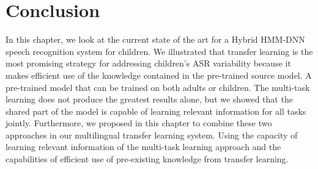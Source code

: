 \section{Conclusion}
In this chapter, we look at the current state of the art for a Hybrid HMM-DNN speech recognition system for children. We illustrated that transfer learning is the most promising strategy for addressing children's ASR variability because it makes efficient use of the knowledge contained in the pre-trained source model. A pre-trained model that can be trained on both adults or children. The multi-task learning does not produce the greatest results alone, but we showed that the shared part of the model is capable of learning relevant information for all tasks jointly. Furthermore, we proposed in this chapter to combine these two approaches in our multilingual transfer learning system. Using the capacity of learning relevant information of the multi-task learning approach and the capabilities of efficient use of pre-existing knowledge from transfer learning. 






